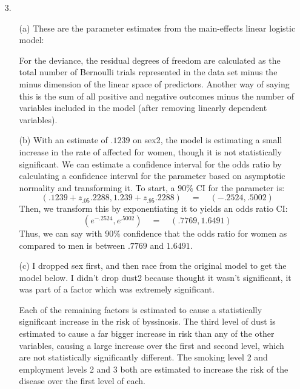 \documentclass[11pt]{article}
\theoremstyle{definition}
\begin{document}
\begin{itemize}
\begin{itemize}
        \end{itemize}
    \item[3.]
        \begin{itemize}
            \item[(a)]
                These are the parameter estimates from the main-effects linear logistic model:
                \FloatBarrier
                
                \FloatBarrier
                For the deviance, the residual degrees of freedom are calculated as the total number of Bernoulli trials represented in the data set minus the minus dimension of the linear space of predictors. Another way of saying this is the sum of all positive and negative outcomes minus the number of variables included in the model (after removing linearly dependent variables). 
            \item[(b)]
                With an estimate of $.1239$ on sex2, the model is estimating a small increase in the rate of affected for women, though it is not statistically significant. We can estimate a confidence interval for the odds ratio by calculating a confidence interval for the parameter based on asymptotic normality and transforming it. To start, a $90\%$ CI for the parameter is:
                \[(.1239+z_{.05}.2288,1.239+z_{.95}.2288)\quad=\quad(-.2524,.5002)\]
                Then, we transform this by exponentiating it to yields an odds ratio CI:
                \[(e^{-.2524},e^{.5002})\quad=\quad (.7769,1.6491)\]
                Thus, we can say with $90\%$ confidence that the odds ratio for women as compared to men is between $.7769$ and $1.6491$.
            \item[(c)]
                I dropped sex first, and then race from the original model to get the model below. I didn't drop dust2 because thought it wasn't significant, it was part of a factor which was extremely significant.
                \FloatBarrier
                
                \FloatBarrier
                Each of the remaining factors is estimated to cause a statistically significant increase in the risk of byssinosis. The third level of dust is estimated to cause a far bigger increase in risk than any of the other variables, causing a large increase over the first and second level, which are not statistically significantly different. The smoking level 2 and employment levels 2 and 3 both are estimated to increase the risk of the disease over the first level of each.

        \end{itemize}
\end{itemize}
\end{document}
